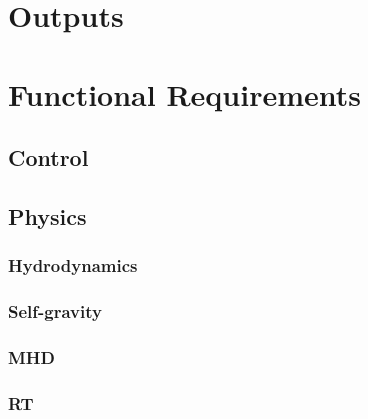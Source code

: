 \documentclass{book}
\begin{document}
\chapter{Outputs} \label{c:outputs}

\chapter{Functional Requirements}

\section{Control}

\section{Physics}

\subsection{Hydrodynamics}

\subsection{Self-gravity}

\subsection{MHD}

\subsection{RT}
\end{document}
